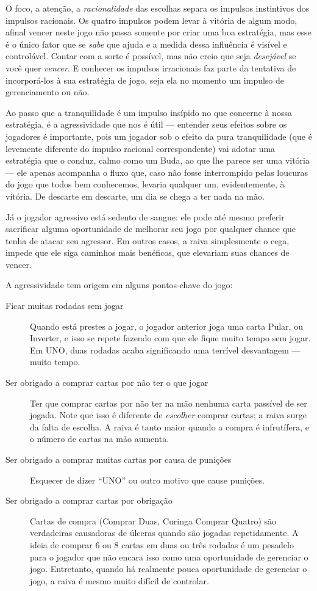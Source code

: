O foco, a atenção, a \textit{racionalidade} das escolhas separa os impulsos instintivos dos impulsos racionais. Os quatro impulsos podem levar à vitória de algum modo, afinal vencer neste jogo não passa somente por criar uma boa estratégia, mas esse é o único fator que se \textit{sabe} que ajuda e a medida dessa influência é visível e controlável. Contar com a sorte é possível, mas não creio que seja \textit{desejável} se você quer \textit{vencer}. E conhecer os impulsos irracionais faz parte da tentativa de incorporá-los à sua estratégia de jogo, seja ela no momento um impulso de gerenciamento ou não.

Ao passo que a tranquilidade é um impulso insípido no que concerne à nossa estratégia, é a agressividade que nos é útil --- entender seus efeitos sobre os jogadores é importante, pois um jogador sob o efeito da pura tranquilidade (que é levemente diferente do impulso racional correspondente) vai adotar uma estratégia que o conduz, calmo como um Buda, ao que lhe parece ser uma vitória --- ele apenas acompanha o fluxo que, caso não fosse interrompido pelas loucuras do jogo que todos bem conhecemos, levaria qualquer um, evidentemente, à vitória. De descarte em descarte, um dia se chega a ter nada na mão.

Já o jogador agressivo está sedento de sangue: ele pode até mesmo preferir sacrificar alguma oportunidade de melhorar seu jogo por qualquer chance que tenha de atacar seu agressor. Em outros casos, a raiva simplesmente o cega, impede que ele siga caminhos mais benéficos, que elevariam suas chances de vencer.

A agressividade tem origem em alguns pontos-chave do jogo:

\begin{description}
\item[Ficar muitas rodadas sem jogar]{Quando está prestes a jogar, o jogador anterior joga uma carta Pular, ou Inverter, e isso se repete fazendo com que ele fique muito tempo sem jogar. Em UNO, duas rodadas acaba significando uma terrível desvantagem --- muito tempo.}
\item[Ser obrigado a comprar cartas por não ter o que jogar]{Ter que comprar cartas por não ter na mão nenhuma carta passível de ser jogada. Note que isso é diferente de \textit{escolher} comprar cartas; a raiva surge da falta de escolha. A raiva é tanto maior quando a compra é infrutífera, e o número de cartas na mão aumenta.}
\item[Ser obrigado a comprar muitas cartas por causa de punições]{Esquecer de dizer ``UNO'' ou outro motivo que cause punições.}
\item[Ser obrigado a comprar cartas por obrigação]{Cartas de compra (Comprar Duas, Curinga Comprar Quatro) são verdadeiras causadoras de úlceras quando são jogadas repetidamente. A ideia de comprar 6 ou 8 cartas em duas ou três rodadas é um pesadelo para o jogador que não encara isso como uma oportunidade de gerenciar o jogo. Entretanto, quando há realmente pouca oportunidade de gerenciar o jogo, a raiva é mesmo muito difícil de controlar.}
\end{description}

